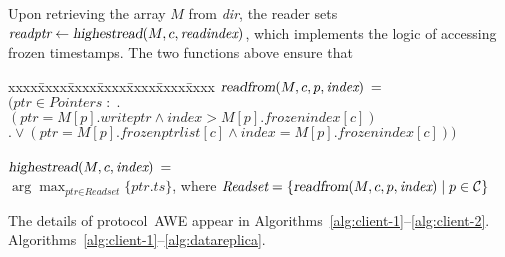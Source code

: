 \documentclass[oribibl]{llncs}
\theoremstyle{definition-boldhead}
\newcommand{\var}[1]{\textit{#1}}
\newcommand{\op}[1]{\textsl{#1}}
\newcommand{\becomes}{\ensuremath{\leftarrow}}
\newcommand{\clientset}{\ensuremath{\mathcal{C}}\xspace}
\newcommand{\dir}{\var{dir}\xspace}
\newcommand{\NAME}{AWE\xspace}
\begin{document}
\noindent
Upon retrieving the array $M$ from \dir, the reader sets
$\var{readptr} \becomes \op{highestread}(M, c, \var{readindex})$,
which implements the logic of accessing frozen timestamps.
\if\submit\no
The two functions above ensure that
\begin{tabbing}\small
xxxx\=xxxx\=xxxx\=xxxx\=xxxx\=xxxx\=xxxx\kill
  \> $\op{readfrom}(M, c, p, \var{index}) \: = \:$ \\
  \> \> $\bigl( \var{ptr} \in \var{Pointers} \; : \; \bigr.$ \\
  \> \> \> $(\var{ptr} = M[p].\var{writeptr} \land
             \var{index} > M[p].\var{frozenindex}[c])$ \\
  \> \> \> $\bigl. \mbox{} \lor (\var{ptr} = M[p].\var{frozenptrlist}[c] \land
            \var{index} = M[p].\var{frozenindex}[c]) \bigr) $ \\
\\
  \> $\op{highestread}(M, c, \var{index}) \: = \:$ \\
  \> \> $\arg\max_{\var{ptr} \in \var{Readset}}
         \bigl\{ \var{ptr}.\var{ts} \bigr\}$,
         where $\var{Readset} = \{ \op{readfrom}(M, c, p, \var{index}) \;|\;
         p \in \clientset \}$
\end{tabbing}
\noindent
\fi
The details of protocol~\NAME appear in
\if\submit\yes
Algorithms~\ref{alg:client-1}--\ref{alg:client-2}.
\else
Algorithms~\ref{alg:client-1}--\ref{alg:datareplica}.
\fi
\end{document}
